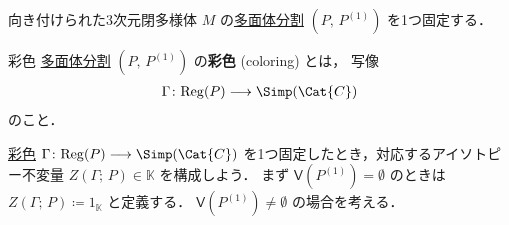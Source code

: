 \documentclass[TQFT_main]{subfiles}
\begin{document}
向き付けられた3次元閉多様体 $M$ の\hyperref[def:polytope-decomp]{多面体分割} $(P,\, P^{(1)})$ を1つ固定する．

\begin{mydef}[label=def:coloring]{彩色}
    \hyperref[def:polytope-decomp]{多面体分割} $(P,\, P^{(1)})$ の\textbf{彩色} (coloring) とは，
    写像
    \begin{align}
        \Gamma \colon \mathrm{Reg}(P) \lto \Simp(\Cat{C})
    \end{align}
    のこと．    
\end{mydef}

\hyperref[def:coloring]{彩色} $\Gamma \colon \mathrm{Reg}(P) \lto \Simp(\Cat{C})$ を1つ固定したとき，対応するアイソトピー不変量 $Z(\Gamma;\, P) \in \mathbb{K}$ を構成しよう．
まず $\mathsf{V}(P^{(1)}) = \emptyset$ のときは $Z(\Gamma;\, P) \coloneqq 1_{\mathbb{K}}$ と定義する．
$\mathsf{V}(P^{(1)}) \neq \emptyset$ の場合を考える．
\end{document}
